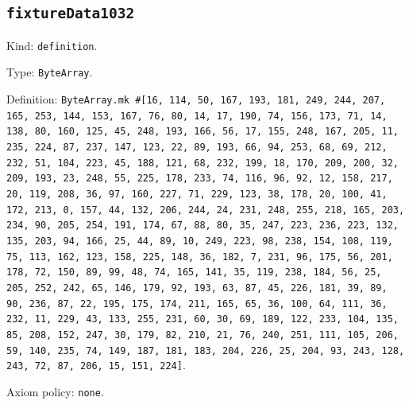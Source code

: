 \documentclass[11pt]{article}
\begin{document}
\subsection*{\texttt{fixtureData1032}}
\noindent Kind: \texttt{definition}.\par
\noindent Type: \texttt{ByteArray}.\par
\noindent Definition: \texttt{ByteArray.mk \#[16, 114, 50, 167, 193, 181, 249, 244, 207, 165, 253, 144, 153, 167, 76, 80, 14, 17, 190, 74, 156, 173, 71, 14, 138, 80, 160, 125, 45, 248, 193, 166, 56, 17, 155, 248, 167, 205, 11, 235, 224, 87, 237, 147, 123, 22, 89, 193, 66, 94, 253, 68, 69, 212, 232, 51, 104, 223, 45, 188, 121, 68, 232, 199, 18, 170, 209, 200, 32, 209, 193, 23, 248, 55, 225, 178, 233, 74, 116, 96, 92, 12, 158, 217, 20, 119, 208, 36, 97, 160, 227, 71, 229, 123, 38, 178, 20, 100, 41, 172, 213, 0, 157, 44, 132, 206, 244, 24, 231, 248, 255, 218, 165, 203, 234, 90, 205, 254, 191, 174, 67, 88, 80, 35, 247, 223, 236, 223, 132, 135, 203, 94, 166, 25, 44, 89, 10, 249, 223, 98, 238, 154, 108, 119, 75, 113, 162, 123, 158, 225, 148, 36, 182, 7, 231, 96, 175, 56, 201, 178, 72, 150, 89, 99, 48, 74, 165, 141, 35, 119, 238, 184, 56, 25, 205, 252, 242, 65, 146, 179, 92, 193, 63, 87, 45, 226, 181, 39, 89, 90, 236, 87, 22, 195, 175, 174, 211, 165, 65, 36, 100, 64, 111, 36, 232, 11, 229, 43, 133, 255, 231, 60, 30, 69, 189, 122, 233, 104, 135, 85, 208, 152, 247, 30, 179, 82, 210, 21, 76, 240, 251, 111, 105, 206, 59, 140, 235, 74, 149, 187, 181, 183, 204, 226, 25, 204, 93, 243, 128, 243, 72, 87, 206, 15, 151, 224]}.\par
\noindent Axiom policy: \texttt{none}.\par
\end{document}
